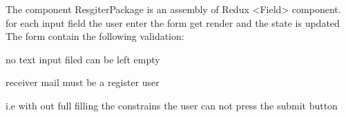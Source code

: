 The component ResgiterPackage is an assembly of Redux <Field> component.
for each input field the user enter the form get render and the state is updated
The form contain the following validation:
\begin{description}[font=$\bullet$~\normalfont\scshape\color{red!50!black}]
\item no text input filed can be left empty 
\item receiver mail must be a register user
\end{description}
i.e with out full filling the constrains the user can not press the submit button


